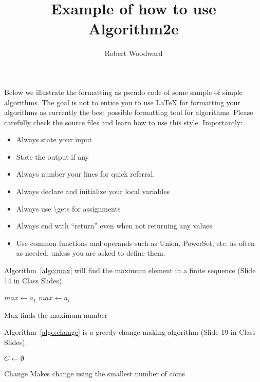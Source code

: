 \documentclass{article}
\title{Example of how to use Algorithm2e}
\author{Robert Woodward}
\begin{document}
\maketitle

Below we illustrate the formatting as pseudo code of some sample
of simple algorithms. The goal is not to entice you to use
\LaTeX\/ for formatting your algorithms as currently the best
possible formatting tool for algorithms. Please carefully check
the source files and learn how to use this style. Importantly:
\begin{itemize}
\item
Always state your input
\item
State the output if any
\item
Always number your lines for quick referral.
\item
Always declare and initialize your local variables
\item
Always use \textbackslash gets for assignments
\item
Always end with ``return'' even when not returning any values
\item
Use common functions and operands such as {\sc Union}, {\sc PowerSet}, etc. as often as needed, unless you are asked to define them.
\end{itemize}

Algorithm~\ref{algo:max} will find
the maximum element in a finite sequence (Slide 14 in Class Slides).

\begin{algorithm}
\DontPrintSemicolon %
$max \gets a_1$\;
 {
   {
    $max \gets a_i$\;
  }
}
\;
\caption{{\sc Max} finds the maximum number}
\label{algo:max}
\end{algorithm}

Algorithm~\ref{algo:change} is a greedy change-making algorithm (Slide 19 in Class Slides).

\begin{algorithm}
\DontPrintSemicolon %
$C \gets \emptyset$\;
\;
\caption{{\sc Change} Makes change using the smallest number of coins}
\label{algo:change}
\end{algorithm}
\end{document}
